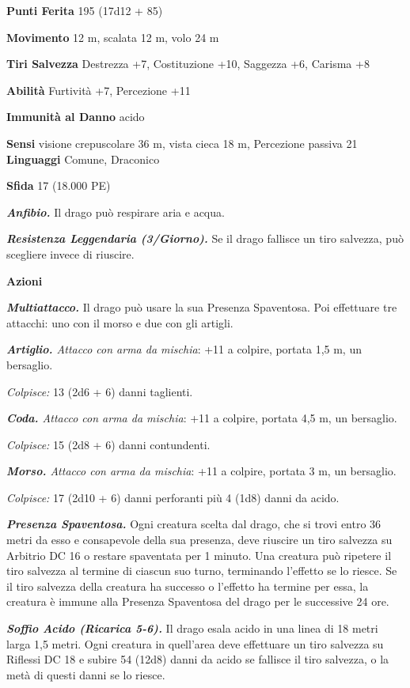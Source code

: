 \begin{multicols}{2}
\textbf{Punti Ferita} 195 (17d12 + 85)

\textbf{Movimento} 12 m, scalata 12 m, volo 24 m

\textbf{Tiri Salvezza} Destrezza +7, Costituzione +10, Saggezza +6,
Carisma +8

\textbf{Abilità} Furtività +7, Percezione +11

\textbf{Immunità al Danno} acido

\textbf{Sensi} visione crepuscolare 36 m, vista cieca 18 m, Percezione passiva
21 \textbf{Linguaggi} Comune, Draconico

\textbf{Sfida} 17 (18.000 PE)

\emph{\textbf{Anfibio.}} Il drago può respirare aria e acqua.

\emph{\textbf{Resistenza Leggendaria (3/Giorno).}} Se il drago fallisce
un tiro salvezza, può scegliere invece di riuscire.

\textbf{Azioni}

\emph{\textbf{Multiattacco.}} Il drago può usare la sua Presenza
Spaventosa. Poi effettuare tre attacchi: uno con il morso e due con gli
artigli.

\emph{\textbf{Artiglio.} Attacco con arma da mischia}: +11 a colpire,
portata 1,5 m, un bersaglio.

\emph{Colpisce:} 13 (2d6 + 6) danni taglienti.

\emph{\textbf{Coda.} Attacco con arma da mischia}: +11 a colpire,
portata 4,5 m, un bersaglio.

\emph{Colpisce:} 15 (2d8 + 6) danni contundenti.

\emph{\textbf{Morso.} Attacco con arma da mischia}: +11 a colpire,
portata 3 m, un bersaglio.

\emph{Colpisce:} 17 (2d10 + 6) danni perforanti più 4 (1d8) danni da
acido.

\emph{\textbf{Presenza Spaventosa.}} Ogni creatura scelta dal drago, che
si trovi entro 36 metri da esso e consapevole della sua presenza, deve
riuscire un tiro salvezza su Arbitrio DC 16 o restare spaventata per 1
minuto. Una creatura può ripetere il tiro salvezza al termine di ciascun
suo turno, terminando l'effetto se lo riesce. Se il tiro salvezza della
creatura ha successo o l'effetto ha termine per essa, la creatura è
immune alla Presenza Spaventosa del drago per le successive 24 ore.

\emph{\textbf{Soffio Acido (Ricarica 5-6).}} Il drago esala acido in una
linea di 18 metri larga 1,5 metri. Ogni creatura in quell'area deve
effettuare un tiro salvezza su Riflessi DC 18 e subire 54 (12d8) danni
da acido se fallisce il tiro salvezza, o la metà di questi danni se lo
riesce.


\end{multicols}

